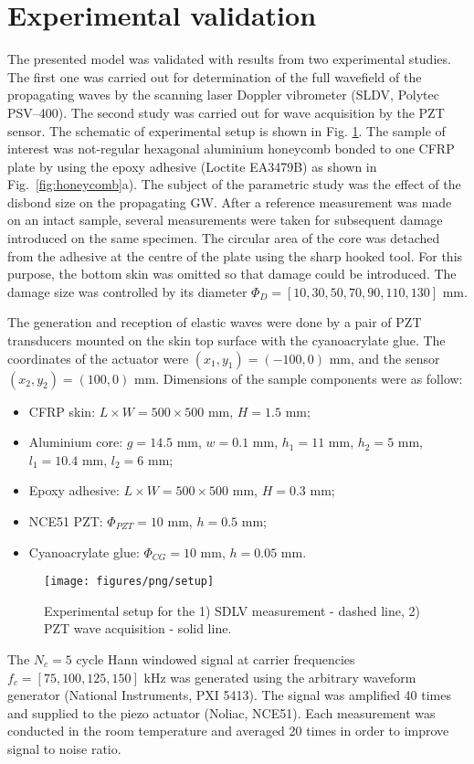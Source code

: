 \documentclass[sensors,article,submit,moreauthors,pdftex]{Definitions/mdpi}
\begin{document}
\section{Experimental validation}
The presented model was validated with results from two
experimental studies.
The first one was carried out for determination of the full wavefield of the propagating waves by the scanning laser Doppler vibrometer (SLDV, Polytec PSV–400).
The second study was carried out for wave acquisition by the PZT sensor.
The schematic of experimental setup is shown in Fig. \ref{fig:setup}.
The sample of interest was not-regular hexagonal aluminium honeycomb bonded to one CFRP plate by using the epoxy adhesive (Loctite EA3479B) as shown in Fig.~\ref{fig:honeycomb}a).
The subject of the parametric study was the effect of the disbond size on the propagating GW.
After a reference measurement was made on an intact sample, several measurements were taken for subsequent damage introduced on the same specimen.
The circular area of the core was detached from the adhesive at the centre of the plate using the sharp hooked tool.
For this purpose, the bottom skin was omitted so that damage could be introduced.
The damage size was controlled by its diameter \(\Phi_D=\left [10, 30, 50, 70, 90, 110, 130 \right ]\) mm.

The generation and reception of elastic waves were done by a pair of PZT transducers mounted on the skin top surface with the cyanoacrylate glue.
The coordinates of the actuator were \((x_1,y_1)=(-100,0)\) mm,	and the sensor \((x_2,y_2)=(100,0)\) mm.
Dimensions of the sample components were as follow:
\begin{itemize}
	\item CFRP skin: \(L \times W = 500 \times 500\) mm, \(H = 1.5\) mm;
	\item Aluminium core: \(g=14.5\) mm, \(w=0.1\) mm, \(h_1=11\) mm, \(h_2=5\) mm, \(l_1=10.4\) mm, \(l_2=6\) mm;
	\item Epoxy adhesive: \(L\times W=500 \times 500\) mm, \(H=0.3 \) mm;
	\item NCE51 PZT: \(\Phi_{PZT}=10\) mm, \(h=0.5\) mm;
	\item Cyanoacrylate glue: \(\Phi_{CG}=10\) mm, \(h=0.05\) mm.
\end{itemize}

\begin{figure}
	\begin{center}
		\texttt{[image: figures/png/setup]}
	\end{center}
	\caption{Experimental setup for the 1) SDLV measurement - dashed line, 2) PZT wave acquisition - solid line.}
	\label{fig:setup}
\end{figure}
The \(N_c=5\) cycle Hann windowed signal at carrier frequencies \(f_c=[75,100,125,150]\) kHz was generated using the arbitrary waveform generator (National Instruments, PXI 5413).
The signal was amplified 40 times and supplied to the piezo actuator (Noliac, NCE51).
Each measurement was conducted in the room temperature and averaged 20 times in order to improve signal to noise ratio.
\end{document}
